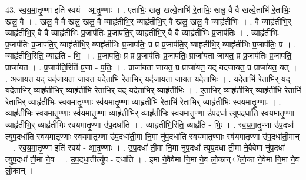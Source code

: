 \documentclass[17pt]{extarticle}
\begin{document}
43. स्व॒य॒मा॒तृ॒ण्णा इति॑ स्वयं - आ॒तृ॒ण्णाः । . ए॒ताभिः॒ खलु॒ खल्वे॒ताभि॑ रे॒ताभिः॒ खलु॒ वै वै खल्वे॒ताभि॑ रे॒ताभिः॒ खलु॒ वै । . खलु॒ वै वै खलु॒ खलु॒ वै व्याहृ॑तीभि॒र् व्याहृ॑तीभि॒र् वै खलु॒ खलु॒ वै व्याहृ॑तीभिः । . वै व्याहृ॑तीभि॒र् व्याहृ॑तीभि॒र् वै वै व्याहृ॑तीभिः प्र॒जाप॑तिः प्र॒जाप॑ति॒र् व्याहृ॑तीभि॒र् वै वै व्याहृ॑तीभिः प्र॒जाप॑तिः । . व्याहृ॑तीभिः प्र॒जाप॑तिः प्र॒जाप॑ति॒र् व्याहृ॑तीभि॒र् व्याहृ॑तीभिः प्र॒जाप॑तिः॒ प्र प्र प्र॒जाप॑ति॒र् व्याहृ॑तीभि॒र् व्याहृ॑तीभिः प्र॒जाप॑तिः॒ प्र । . व्याहृ॑तीभि॒रिति॒ व्याहृ॑ति - भिः॒ । . प्र॒जाप॑तिः॒ प्र प्र प्र॒जाप॑तिः प्र॒जाप॑तिः॒ प्राजा॑यता जायत॒ प्र प्र॒जाप॑तिः प्र॒जाप॑तिः॒ प्राजा॑यत । . प्र॒जाप॑ति॒रिति॑ प्र॒जा - प॒तिः॒ । . प्राजा॑यता जायत॒ प्र प्राजा॑यत॒ यद् यद॑जायत॒ प्र प्राजा॑यत॒ यत् । . अ॒जा॒य॒त॒ यद् यद॑जायता जायत॒ यदे॒ताभि॑ रे॒ताभि॒र् यद॑जायता जायत॒ यदे॒ताभिः॑ । . यदे॒ताभि॑ रे॒ताभि॒र् यद् यदे॒ताभि॒र् व्याहृ॑तीभि॒र् व्याहृ॑तीभि रे॒ताभि॒र् यद् यदे॒ताभि॒र् व्याहृ॑तीभिः । . ए॒ताभि॒र् व्याहृ॑तीभि॒र् व्याहृ॑तीभि रे॒ताभि॑ रे॒ताभि॒र् व्याहृ॑तीभिः स्वयमातृ॒ण्णाः स्व॑यमातृ॒ण्णा व्याहृ॑तीभि रे॒ताभि॑ रे॒ताभि॒र् व्याहृ॑तीभिः स्वयमातृ॒ण्णाः । . व्याहृ॑तीभिः स्वयमातृ॒ण्णाः स्व॑यमातृ॒ण्णा व्याहृ॑तीभि॒र् व्याहृ॑तीभिः स्वयमातृ॒ण्णा उ॑प॒दधा᳚ त्युप॒दधा॑ति स्वयमातृ॒ण्णा व्याहृ॑तीभि॒र् व्याहृ॑तीभिः स्वयमातृ॒ण्णा उ॑प॒दधा॑ति । . व्याहृ॑तीभि॒रिति॒ व्याहृ॑ति - भिः॒ । . स्व॒य॒मा॒तृ॒ण्णा उ॑प॒दधा᳚ त्युप॒दधा॑ति स्वयमातृ॒ण्णाः स्व॑यमातृ॒ण्णा उ॑प॒दधा॑ती॒मा नि॒मा नु॑प॒दधा॑ति स्वयमातृ॒ण्णाः स्व॑यमातृ॒ण्णा उ॑प॒दधा॑ती॒मान् । . स्व॒य॒मा॒तृ॒ण्णा इति॑ स्वयं - आ॒तृ॒ण्णाः । . उ॒प॒दधा॑ ती॒मा नि॒मा नु॑प॒दधा᳚ त्युप॒दधा॑ ती॒मा ने॒वैवेमा नु॑प॒दधा᳚ त्युप॒दधा॑ ती॒मा ने॒व । . उ॒प॒दधा॒तीत्यु॑प - दधा॑ति । . इ॒मा ने॒वैवेमा नि॒मा ने॒व लो॒कान् ॅलो॒का ने॒वेमा नि॒मा ने॒व लो॒कान् । \newline
\end{document}
